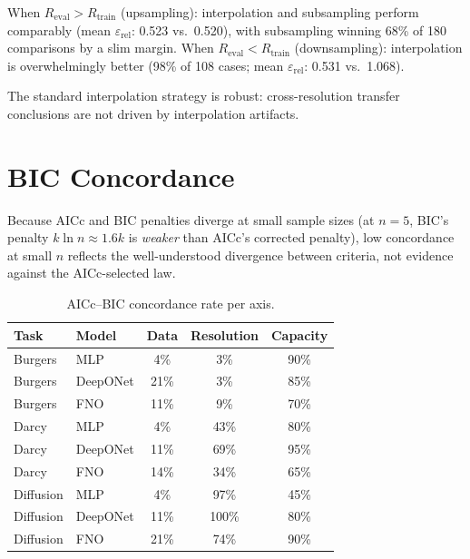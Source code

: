 \documentclass[11pt]{article}
\newcommand{\Reval}{R_{\mathrm{eval}}}
\newcommand{\Rtrain}{R_{\mathrm{train}}}
\newcommand{\relLtwo}{\varepsilon_{\mathrm{rel}}}
\begin{document}
When $\Reval > \Rtrain$ (upsampling): interpolation and subsampling
perform comparably (mean $\relLtwo$: 0.523 vs.\ 0.520), with
subsampling winning 68\% of 180 comparisons by a slim margin.
When $\Reval < \Rtrain$ (downsampling): interpolation is overwhelmingly
better (98\% of 108 cases; mean $\relLtwo$: 0.531 vs.\ 1.068).

The standard interpolation strategy is robust: cross-resolution
transfer conclusions are not driven by interpolation artifacts.


\section{BIC Concordance}
\label{app:bic}

Because AICc and BIC penalties diverge at small sample sizes
(at $n = 5$, BIC's penalty $k \ln n \approx 1.6k$ is \emph{weaker}
than AICc's corrected penalty), low concordance at small $n$ reflects
the well-understood divergence between criteria, not evidence against
the AICc-selected law.

\begin{table}[h]
\centering
\caption{AICc--BIC concordance rate per axis.}
\label{tab:bic}
\begin{tabular}{@{}llccc@{}}
\toprule
\textbf{Task} & \textbf{Model} & \textbf{Data} & \textbf{Resolution} &
\textbf{Capacity} \\
\midrule
Burgers   & MLP      & 4\%  & 3\%   & 90\% \\
Burgers   & DeepONet & 21\% & 3\%   & 85\% \\
Burgers   & FNO      & 11\% & 9\%   & 70\% \\
Darcy     & MLP      & 4\%  & 43\%  & 80\% \\
Darcy     & DeepONet & 11\% & 69\%  & 95\% \\
Darcy     & FNO      & 14\% & 34\%  & 65\% \\
Diffusion & MLP      & 4\%  & 97\%  & 45\% \\
Diffusion & DeepONet & 11\% & 100\% & 80\% \\
Diffusion & FNO      & 21\% & 74\%  & 90\% \\
\bottomrule
\end{tabular}
\end{table}
\end{document}
